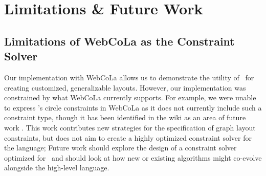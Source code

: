 \section{Limitations \& Future Work}





\subsection{Limitations of WebCoLa as the Constraint Solver}




Our implementation with WebCoLa allows us to demonstrate the utility of \projectname~for creating customized, generalizable layouts. However, our implementation was constrained by what WebCoLa currently supports. For example, we were unable to express \projectname's circle constraints in WebCoLa as it does not currently include such a constraint type, though it has been identified in the wiki as an area of future work . This work contributes new strategies for the specification of graph layout constraints, but does not aim to create a highly optimized constraint solver for the language; Future work should explore the design of a constraint solver optimized for \projectname~and should look at how new or existing algorithms might co-evolve alongside the high-level language.

